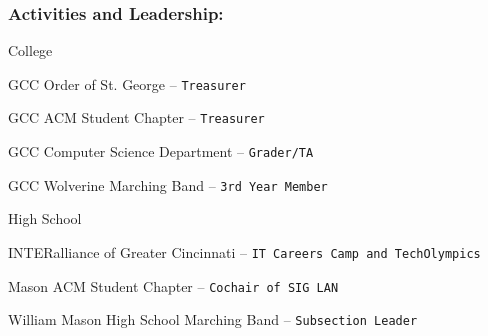 \documentclass[12pt]{article}
\begin{document}
\subsubsection*{\color{head}Activities and Leadership:}
College
\begin{compactitem}
	\item {\color{accent} GCC Order of St. George} -- \texttt{Treasurer}
	\item {\color{accent} GCC ACM Student Chapter} -- \texttt{Treasurer}
	\item {\color{accent} GCC Computer Science Department} -- \texttt{Grader/TA}
	\item {\color{accent} GCC Wolverine Marching Band} -- \texttt{3rd Year Member}
\end{compactitem}
High School
\begin{compactitem}
	\item {\color{accent} INTERalliance of Greater Cincinnati} -- \texttt{IT Careers Camp and TechOlympics}
	\item {\color{accent} Mason ACM Student Chapter} -- \texttt{Cochair of SIG LAN}
	\item {\color{accent} William Mason High School Marching Band} -- \texttt{Subsection Leader}
\end{compactitem}
\end{document}
